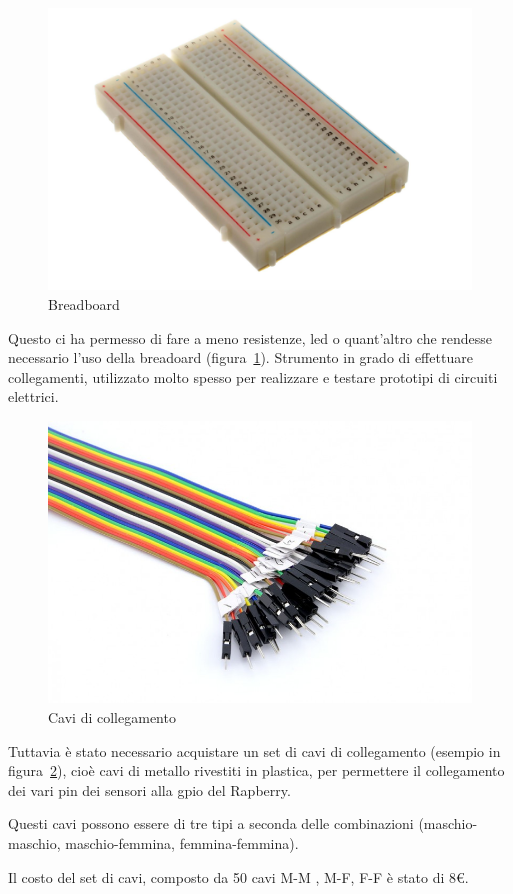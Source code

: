 \begin{figure}
	\centering
	\includegraphics[width=0.7\linewidth]{Figures/Sensors&Rasp/breadboard}
	\caption[breadb]{Breadboard}
	\label{fig:bb}
	
\end{figure}

Questo ci ha permesso di fare a meno  resistenze, led o quant'altro che rendesse necessario l'uso della breadoard (figura~\ref{fig:bb}).
Strumento in grado di effettuare collegamenti, utilizzato molto spesso per realizzare e testare prototipi di circuiti elettrici.

\begin{figure}
	\centering
	\includegraphics[width=0.7\linewidth]{Figures/Sensors&Rasp/cables}
	\caption[cable]{Cavi di collegamento}
	\label{fig:cables}
	
\end{figure}

\newpage

Tuttavia è stato necessario acquistare un set di cavi di collegamento (esempio in figura~\ref{fig:cables}), cioè cavi di metallo rivestiti in plastica, per permettere il collegamento dei vari pin dei sensori alla gpio del Rapberry.
	
Questi cavi possono essere di tre tipi a seconda delle combinazioni (maschio-maschio, maschio-femmina, femmina-femmina).

Il costo del set di cavi, composto da 50 cavi M-M , M-F, F-F è stato di 8€.

\newpage


